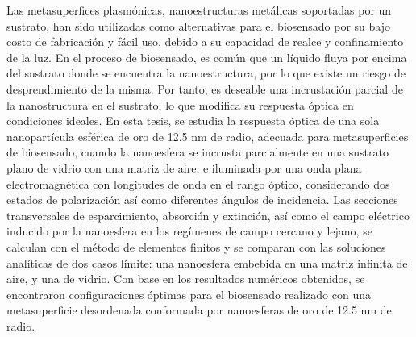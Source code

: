 \begin{abstracts}
Las metasuperfices plasmónicas, nanoestructuras metálicas soportadas por un sustrato, han sido utilizadas como alternativas para el biosensado por su bajo costo de fabricación y fácil uso, debido a su capacidad de realce y confinamiento de la luz. En el proceso de biosensado, es común que un líquido fluya por encima del sustrato donde se encuentra la nanoestructura, por lo que existe un riesgo de desprendimiento de la misma. Por tanto, es deseable una incrustación parcial de la nanostructura en el sustrato, lo que modifica su respuesta óptica en condiciones ideales. En esta tesis, se estudia la respuesta óptica de una sola nanopartícula esférica de oro de 12.5 nm de radio, adecuada para metasuperficies de biosensado, cuando la nanoesfera se incrusta parcialmente en una sustrato plano de vidrio con una matriz de aire, e iluminada por una onda plana electromagnética con longitudes de onda en el rango óptico, considerando dos estados de polarización así como diferentes ángulos de incidencia. Las secciones transversales de esparcimiento, absorción y extinción, así como el campo eléctrico inducido por la nanoesfera en los regímenes de campo cercano y lejano, se calculan con el método de elementos finitos y se comparan con las soluciones analíticas de dos casos límite: una nanoesfera embebida en una matriz infinita de aire, y una de vidrio. Con base en los resultados numéricos obtenidos, se encontraron configuraciones óptimas para el biosensado realizado con una metasuperficie desordenada conformada por nanoesferas de oro de 12.5 nm de radio.



\end{abstracts}


